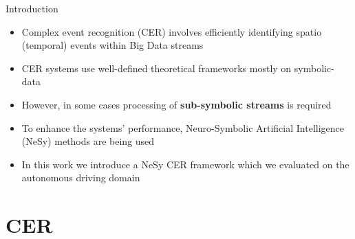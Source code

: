 \documentclass[10pt, aspectratio=169]{beamer}
\begin{document}
\begin{frame}{Introduction}
    \begin{itemize}
        \setlength{\itemsep}{12pt}
        \item \textcolor{umBlueLighter}{Complex event recognition (CER)} involves efficiently identifying spatio (temporal) events within Big Data streams 
        \item CER systems use well-defined theoretical frameworks mostly on symbolic-data
        \item However, in some cases processing of \textbf{sub-symbolic streams} is required
        \item To enhance the systems' performance, \textcolor{umBlueLighter}{Neuro-Symbolic Artificial Intelligence (NeSy)} methods are being used
        \item In this work we introduce a NeSy CER framework which we evaluated on the autonomous driving domain
    \end{itemize}
\end{frame}

\section{CER}
{
    \begin{frame}
        \sectionpage%
    \end{frame}
}
\end{document}

